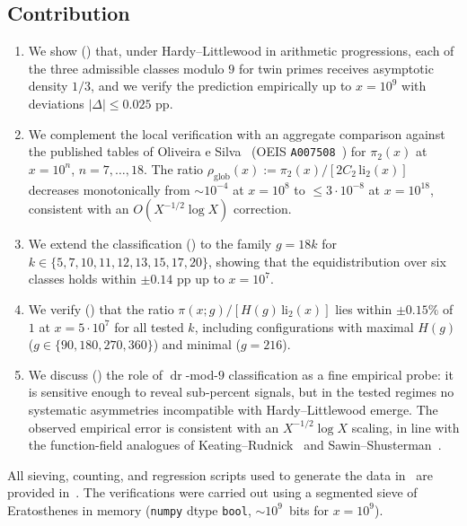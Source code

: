 \documentclass[11pt]{amsart}
\theoremstyle{plain}
\theoremstyle{definition}
\theoremstyle{remark}
\DeclareMathOperator{\dr}{dr}
\begin{document}
\subsection*{Contribution}
\begin{enumerate}
\item We show () that, under Hardy--Littlewood in
  arithmetic progressions, each of the three admissible classes modulo
  $9$ for twin primes receives asymptotic density $1/3$, and we verify
  the prediction empirically up to $x = 10^9$ with deviations
  $|\Delta| \le 0.025$ pp.
\item We complement the local verification with an aggregate
  comparison against the published tables of Oliveira e
  Silva~\cite{TOS} (OEIS \texttt{A007508}~\cite{OEISA007508})
  for $\pi_2(x)$ at $x = 10^n$, $n = 7,\ldots,18$. The ratio
  $\rho_{\mathrm{glob}}(x) := \pi_2(x)/[2C_2\,\mathrm{li}_2(x)]$
  decreases monotonically from $\sim 10^{-4}$ at $x = 10^8$ to
  $\le 3 \cdot 10^{-8}$ at $x = 10^{18}$, consistent with an
  $O(X^{-1/2}\log X)$ correction.
\item We extend the classification () to the family
  $g = 18k$ for $k \in \{5,7,10,11,12,13,15,17,20\}$, showing that
  the equidistribution over six classes holds within $\pm 0.14$ pp up
  to $x = 10^7$.
\item We verify () that the ratio
  $\pi(x;g)/[H(g)\,\mathrm{li}_2(x)]$ lies within $\pm 0.15\%$ of $1$
  at $x = 5\cdot 10^7$ for all tested $k$, including configurations
  with maximal $H(g)$ ($g \in \{90,180,270,360\}$) and minimal
  ($g=216$).
\item We discuss () the role of $\dr$-mod-$9$
  classification as a fine empirical probe: it is sensitive enough to
  reveal sub-percent signals, but in the tested regimes no systematic
  asymmetries incompatible with Hardy--Littlewood emerge. The observed
  empirical error is consistent with an $X^{-1/2}\log X$ scaling, in
  line with the function-field analogues of
  Keating--Rudnick~\cite{KR14} and Sawin--Shusterman~\cite{SS22}.
\end{enumerate}

\smallskip
All sieving, counting, and regression scripts used to generate the data
in~ are provided
in~\cite{ScriptsRepo}. The verifications were carried out using a
segmented sieve of Eratosthenes in memory (\texttt{numpy} dtype
\texttt{bool}, $\sim 10^9$~bits for $x = 10^9$).
\end{document}
